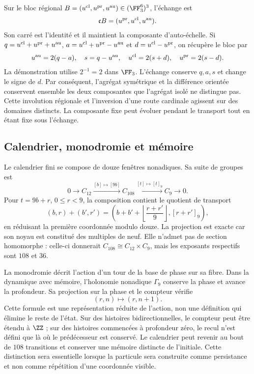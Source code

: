 Sur le bloc régional
\(B=(u^{\rm cl},u^{\rm pr},u^{\rm au})\in(\FF_3^6)^3\),
l’échange est
\[
 \mathfrak cB=(u^{\rm pr},u^{\rm cl},u^{\rm au}).
\]
Son carré est l’identité et il maintient la composante d’auto-échelle.
Si \(q=u^{\rm cl}+u^{\rm pr}+u^{\rm au}\),
\(a=u^{\rm cl}+u^{\rm pr}-u^{\rm au}\) et
\(d=u^{\rm cl}-u^{\rm pr}\), on récupère le bloc par
\[
 u^{\rm au}=2(q-a),\quad s=q-u^{\rm au},\quad
 u^{\rm cl}=2(s+d),\quad u^{\rm pr}=2(s-d).
\]
La démonstration utilise \(2^{-1}=2\) dans \(\FF_3\). L’échange
conserve \(q,a,s\) et change le signe de \(d\). Par conséquent,
l’agrégat symétrique et la différence orientée conservent ensemble
les deux composantes que l’agrégat isolé ne distingue pas.
Cette involution régionale et l’inversion d’une route cardinale
agissent sur des domaines distincts. La composante fixe peut
évoluer pendant le transport tout en étant fixe sous l’échange.

\subsection{Calendrier, monodromie et mémoire}

Le calendrier fini se compose de douze fenêtres nonadiques. Sa
suite de groupes est
\begin{equation}
 0\longrightarrow C_{12}\xrightarrow{[b]\mapsto[9b]}C_{108}
 \xrightarrow{[t]\mapsto[t]_9}C_9\longrightarrow0.
 \label{vi:eq:extension108}
\end{equation}
Pour \(t=9b+r\), \(0\le r<9\), la composition contient
le quotient de transport
\[
 (b,r)+(b',r')=
 \left(b+b'+\left\lfloor\frac{r+r'}9\right\rfloor,
       [r+r']_9\right),
\]
en réduisant la première coordonnée modulo douze. La projection est
exacte car son noyau est constitué des multiples de neuf. Elle n’admet pas de
section homomorphe : celle-ci donnerait \(C_{108}\cong C_{12}\times C_9\),
mais les exposants respectifs sont \(108\) et \(36\).

La monodromie décrit l’action d’un tour de la base de phase
sur sa fibre. Dans la dynamique avec mémoire, l’holonomie nonadique
\(\Gamma_9\) conserve la phase et avance la profondeur. Sa
projection sur la phase et le compteur vérifie
\[
 (r,n)\longmapsto(r,n+1).
\]
Cette formule est une représentation réduite de l’action, non une
définition qui élimine le reste de l’état. Sur des histoires
bidirectionnelles, le compteur peut être étendu à \(\ZZ\) ; sur des
histoires commencées à profondeur zéro, le recul n’est
défini que là où le prédécesseur est conservé. Le calendrier peut
revenir au bout de \(108\) transitions et conserver une mémoire
distincte de l’initiale. Cette distinction sera essentielle lorsque la
particule sera construite comme persistance et non comme répétition d’une
coordonnée visible.


